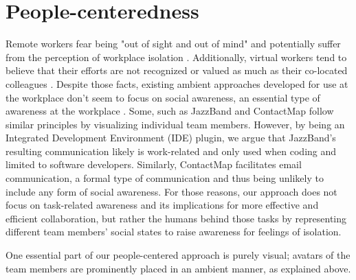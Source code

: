 \section{People-centeredness}
Remote workers fear being "out of sight and out of mind" \autocite{bailey1999advantages} and potentially suffer from the perception of workplace isolation \autocite{mulki2009set, marshall2007workplace}. Additionally, virtual workers tend to believe that their efforts are not recognized or valued as much as their co-located colleagues \autocite{cooper2002telecommuting}. Despite those facts, existing ambient approaches developed for use at the workplace don't seem to focus on social awareness, an essential type of awareness at the workplace \autocite{greenberg1996awareness}. Some, such as JazzBand and ContactMap \autocite{cheng2003jazzing, whittaker2004contactmap} follow similar principles by visualizing individual team members. However, by being an Integrated Development Environment (IDE) plugin, we argue that JazzBand's resulting communication likely is work-related and only used when coding and limited to software developers. Similarly, ContactMap facilitates email communication, a formal type of communication and thus being unlikely to include any form of social awareness. For those reasons, our approach does not focus on task-related awareness and its implications for more effective and efficient collaboration, but rather the humans behind those tasks by representing different team members' social states to raise awareness for feelings of isolation.

One essential part of our people-centered approach is purely visual; avatars of the team members are prominently placed in an ambient manner, as explained above.

